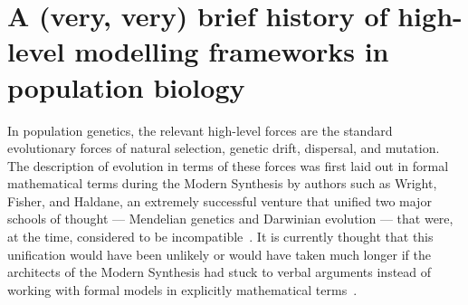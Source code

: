 \section{A (very, very) brief history of high-level modelling frameworks in population biology}\label{sec_history}

In population genetics, the relevant high-level forces are the standard evolutionary forces of natural selection, genetic drift, dispersal, and mutation. The description of evolution in terms of these forces was first laid out in formal mathematical terms during the Modern Synthesis by authors such as Wright, Fisher, and Haldane, an extremely successful venture that unified two major schools of thought --- Mendelian genetics and Darwinian evolution --- that were, at the time, considered to be incompatible~\citep{provine_origins_2001}. It is currently thought that this unification would have been unlikely or would have taken much longer if the architects of the Modern Synthesis had stuck to verbal arguments instead of working with formal models in explicitly mathematical terms~\citep{walsh_darwins_2014}. 

